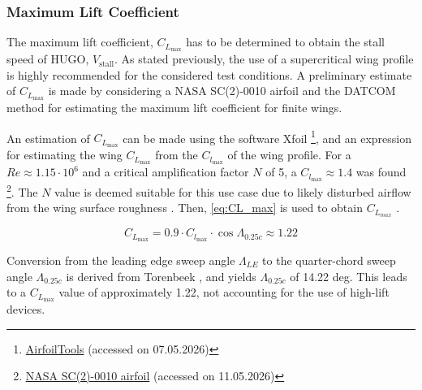 \subsubsection*{Maximum Lift Coefficient}
The maximum lift coefficient, $C_{L_\text{max}}$ has to be determined to obtain the stall speed of HUGO, $V_\text{stall}$. As stated previously, the use of a supercritical wing profile is highly recommended for the considered test conditions. A preliminary estimate of  $C_{L_\text{max}}$ is made by considering a NASA SC(2)-0010 airfoil and the DATCOM method for estimating the maximum lift coefficient for finite wings. 

An estimation of $C_{L_\text{max}}$ can be made using the software Xfoil \footnote{\href{http://airfoiltools.com/polar/details?polar=xf-sc20412-il-500000-n5}{AirfoilTools} (accessed on 07.05.2026)}, and an expression for estimating the wing $C_{L_\text{max}}$ from the $C_{l_\text{max}}$ of the wing profile. For a $Re \approx 1.15\cdot10^6$ and a critical amplification factor $N$ of 5, a $C_{l_\text{max}} \approx 1.4$ was found \footnote{\href{http://www.airfoiltools.com/polar/details?polar=xf-sc20010-il-1000000-n5}{NASA SC(2)-0010 airfoil} (accessed on 11.05.2026)}. The $N$ value is deemed suitable for this use case due to likely disturbed airflow from the wing surface roughness \cite{Koul}. Then, \autoref{eq:CL_max} is used to obtain $C_{L_{max}}$ \cite[p. 153]{Torenbeek1982}.

\begin{equation}
    C_{L_{\max}} = 0.9 \cdot C_{l_{\max}} \cdot \cos\Lambda_{0.25c} \approx 1.22
    \label{eq:CL_max}
\end{equation}

Conversion from the leading edge sweep angle $\Lambda_{LE}$ to the quarter-chord sweep angle $\Lambda_{0.25c}$ is derived from Torenbeek
\cite[p. 440]{Torenbeek1982}, and yields $\Lambda_{0.25c}$ of 14.22 deg. This leads to a $C_{L_{\max}}$ value of approximately 1.22, not accounting for the use of high-lift devices.

